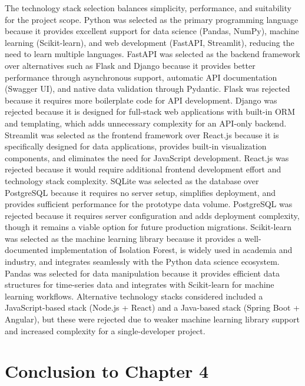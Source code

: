 The technology stack selection balances simplicity, performance, and suitability for the project scope. Python was selected as the primary programming language because it provides excellent support for data science (Pandas, NumPy), machine learning (Scikit-learn), and web development (FastAPI, Streamlit), reducing the need to learn multiple languages. FastAPI was selected as the backend framework over alternatives such as Flask and Django because it provides better performance through asynchronous support, automatic API documentation (Swagger UI), and native data validation through Pydantic. Flask was rejected because it requires more boilerplate code for API development. Django was rejected because it is designed for full-stack web applications with built-in ORM and templating, which adds unnecessary complexity for an API-only backend. Streamlit was selected as the frontend framework over React.js because it is specifically designed for data applications, provides built-in visualization components, and eliminates the need for JavaScript development. React.js was rejected because it would require additional frontend development effort and technology stack complexity. SQLite was selected as the database over PostgreSQL because it requires no server setup, simplifies deployment, and provides sufficient performance for the prototype data volume. PostgreSQL was rejected because it requires server configuration and adds deployment complexity, though it remains a viable option for future production migrations. Scikit-learn was selected as the machine learning library because it provides a well-documented implementation of Isolation Forest, is widely used in academia and industry, and integrates seamlessly with the Python data science ecosystem. Pandas was selected for data manipulation because it provides efficient data structures for time-series data and integrates with Scikit-learn for machine learning workflows. Alternative technology stacks considered included a JavaScript-based stack (Node.js + React) and a Java-based stack (Spring Boot + Angular), but these were rejected due to weaker machine learning library support and increased complexity for a single-developer project.

\section*{Conclusion to Chapter 4}

